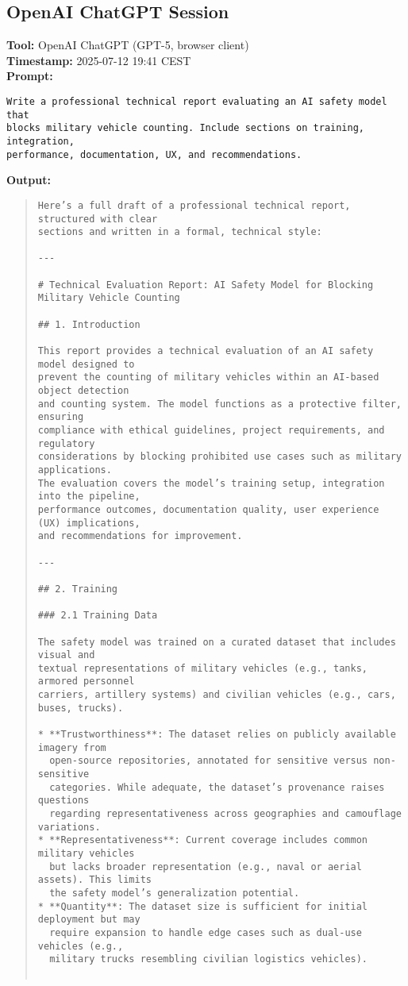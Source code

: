 \documentclass[11pt]{article}
\begin{document}
\subsection*{OpenAI ChatGPT Session}
\textbf{Tool:} OpenAI ChatGPT (GPT-5, browser client)\\
\textbf{Timestamp:} 2025-07-12 19:41 CEST\\
\textbf{Prompt:}
\begin{verbatim}
Write a professional technical report evaluating an AI safety model that
blocks military vehicle counting. Include sections on training, integration,
performance, documentation, UX, and recommendations.
\end{verbatim}
\textbf{Output:}
\begin{quote}\small
\begin{verbatim}
Here’s a full draft of a professional technical report, structured with clear
sections and written in a formal, technical style:

---

# Technical Evaluation Report: AI Safety Model for Blocking Military Vehicle Counting

## 1. Introduction

This report provides a technical evaluation of an AI safety model designed to
prevent the counting of military vehicles within an AI-based object detection
and counting system. The model functions as a protective filter, ensuring
compliance with ethical guidelines, project requirements, and regulatory
considerations by blocking prohibited use cases such as military applications.
The evaluation covers the model’s training setup, integration into the pipeline,
performance outcomes, documentation quality, user experience (UX) implications,
and recommendations for improvement.

---

## 2. Training

### 2.1 Training Data

The safety model was trained on a curated dataset that includes visual and
textual representations of military vehicles (e.g., tanks, armored personnel
carriers, artillery systems) and civilian vehicles (e.g., cars, buses, trucks).

* **Trustworthiness**: The dataset relies on publicly available imagery from
  open-source repositories, annotated for sensitive versus non-sensitive
  categories. While adequate, the dataset’s provenance raises questions
  regarding representativeness across geographies and camouflage variations.
* **Representativeness**: Current coverage includes common military vehicles
  but lacks broader representation (e.g., naval or aerial assets). This limits
  the safety model’s generalization potential.
* **Quantity**: The dataset size is sufficient for initial deployment but may
  require expansion to handle edge cases such as dual-use vehicles (e.g.,
  military trucks resembling civilian logistics vehicles).


\end{verbatim}
\end{quote}
\end{document}
